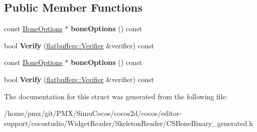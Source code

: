 \subsection*{Public Member Functions}
\begin{DoxyCompactItemize}
\item 
\mbox{\label{structflatbuffers_1_1SkeletonOptions_a083a1855ea83cd2887106620de11c50e}} 
const \hyperlink{structflatbuffers_1_1BoneOptions}{Bone\+Options} $\ast$ {\bfseries bone\+Options} () const
\item 
\mbox{\label{structflatbuffers_1_1SkeletonOptions_aefc539b0317aa3e0dc3bf5125378d92c}} 
bool {\bfseries Verify} (\hyperlink{classflatbuffers_1_1Verifier}{flatbuffers\+::\+Verifier} \&verifier) const
\item 
\mbox{\label{structflatbuffers_1_1SkeletonOptions_a083a1855ea83cd2887106620de11c50e}} 
const \hyperlink{structflatbuffers_1_1BoneOptions}{Bone\+Options} $\ast$ {\bfseries bone\+Options} () const
\item 
\mbox{\label{structflatbuffers_1_1SkeletonOptions_aefc539b0317aa3e0dc3bf5125378d92c}} 
bool {\bfseries Verify} (\hyperlink{classflatbuffers_1_1Verifier}{flatbuffers\+::\+Verifier} \&verifier) const
\end{DoxyCompactItemize}


The documentation for this struct was generated from the following file\+:\begin{DoxyCompactItemize}
\item 
/home/pmx/git/\+P\+M\+X/\+Simu\+Cocos/cocos2d/cocos/editor-\/support/cocostudio/\+Widget\+Reader/\+Skeleton\+Reader/C\+S\+Bone\+Binary\+\_\+generated.\+h\end{DoxyCompactItemize}
